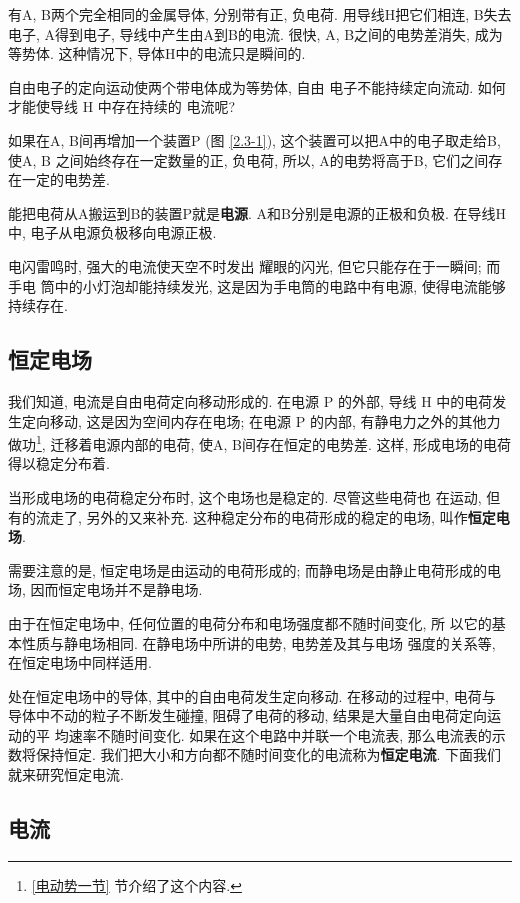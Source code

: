 \documentclass[11pt,a4paper]{ctexbook}
\begin{document}
有A, B两个完全相同的金属导体, 分别带有正, 负电荷. 用导线H把它们相连,
B失去电子, A得到电子, 导线中产生由A到B的电流.
很快, A, B之间的电势差消失, 成为等势体. 这种情况下, 导体H中的电流只是瞬间的.

自由电子的定向运动使两个带电体成为等势体, 自由
电子不能持续定向流动. 如何才能使导线 H 中存在持续的
电流呢?

如果在A, B间再增加一个装置P (图 \ref{2.3-1}), 这个装置可以把A中的电子取走给B, 使A, B
之间始终存在一定数量的正, 负电荷, 所以, A的电势将高于B,
它们之间存在一定的电势差.

能把电荷从A搬运到B的装置P就是\textbf{电源}. A和B分别是电源的正极和负极.
在导线H中, 电子从电源负极移向电源正极.

电闪雷鸣时, 强大的电流使天空不时发出
耀眼的闪光, 但它只能存在于一瞬间; 而手电
筒中的小灯泡却能持续发光, 这是因为手电筒的电路中有电源,
使得电流能够持续存在.

\subsection{恒定电场}

我们知道, 电流是自由电荷定向移动形成的. 在电源 P 的外部, 导线 H 中的电荷发生定向移动, 这是因为空间内存在电场; 在电源 P 的内部, 有静电力之外的其他力做功\footnote{\ref{电动势一节} 节介绍了这个内容.}, 迁移着电源内部的电荷, 使A, B间存在恒定的电势差. 这样, 形成电场的电荷得以稳定分布着.

当形成电场的电荷稳定分布时, 这个电场也是稳定的. 尽管这些电荷也
在运动, 但有的流走了, 另外的又来补充. 这种稳定分布的电荷形成的稳定的电场, 叫作\textbf{恒定电场}.

需要注意的是, 恒定电场是由运动的电荷形成的; 而静电场是由静止电荷形成的电场, 因而恒定电场并不是静电场.

由于在恒定电场中, 任何位置的电荷分布和电场强度都不随时间变化, 所
以它的基本性质与静电场相同. 在静电场中所讲的电势, 电势差及其与电场
强度的关系等, 在恒定电场中同样适用.

处在恒定电场中的导体, 其中的自由电荷发生定向移动. 在移动的过程中, 电荷与
导体中不动的粒子不断发生碰撞, 阻碍了电荷的移动, 结果是大量自由电荷定向运动的平
均速率不随时间变化. 如果在这个电路中并联一个电流表, 那么电流表的示数将保持恒定.
我们把大小和方向都不随时间变化的电流称为\textbf{恒定电流}. 下面我们就来研究恒定电流.

\subsection{电流}
\end{document}
